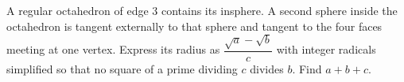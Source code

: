 A regular octahedron of edge 3 contains its insphere. A second sphere inside the octahedron is tangent externally to that sphere and tangent to the four faces meeting at one vertex. Express its radius as $\dfrac{\sqrt a-\sqrt b}{c}$ with integer radicals simplified so that no square of a prime dividing $c$ divides $b$. Find $a+b+c$.
